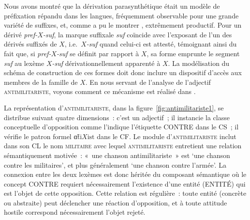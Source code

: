 \documentclass[output=paper]{langsci/langscibook}
\begin{document}



Nous avons montré que  la dérivation parasynthétique était un modèle de préfixation répandu dans les langues, fréquemment observable pour une grande variété de suffixes, et, comme a pu le montrer \cite{hathout2011.dumal}, extrêmement productif.  Pour un dérivé \emph{\mbox{pref-$X$-suf}},  la marque suffixale \emph{suf} coïncide avec l'exposant de l'un des dérivés suffixés de $X$, i.e.\ \emph{\mbox{$X$-suf}} quand celui-ci est attesté, témoignant ainsi du fait que, si \emph{\mbox{pref-$X$-suf}} se définit par rapport à $X$, sa forme emprunte
 le segment \emph{suf} au lexème \emph{\mbox{$X$-suf}} dérivationnellement apparenté à $X$.  La modélisation du schéma de construction de ces formes doit donc inclure un dispositif d'accès aux membres de la famille de $X$. En nous servant de l'analyse de l'adjectif \textsc{antimilitariste}, voyons comment ce mécanisme est réalisé dans \paradis{}.


La représentation d'\textsc{antimilitariste}, dans la figure~\ref{fig:antimilitariste1}, se distribue suivant quatre dimensions~: c'est un adjectif~; il instancie la classe conceptuelle d'opposition comme l'indique l'étiquette {CONTRE} dans le CS~; il vérifie le patron formel $\textrm{ɑ̃ti}X\textrm{ist}$
 dans le CF.  Le module d'\textsc{antimilitariste}
inclut dans son CL le nom \textsc{militaire} avec lequel \textsc{antimilitariste} entretient une relation sémantiquement motivée~: «~une chanson antimilitariste~» est `une chanson contre les militaires', et plus généralement `une chanson contre l'armée'.  La connexion entre les deux lexèmes est donc héritée du composant sémantique où le concept {CONTRE} requiert nécessairement l'existence d'une entité ({ENTITÉ}) qui est l'objet de cette opposition. Cette relation est régulière~: toute entité (concrète ou abstraite) peut déclencher une réaction d'opposition, et à toute attitude hostile correspond nécessairement l'objet rejeté.
\end{document}
